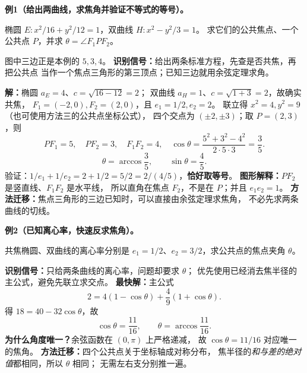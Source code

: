 \clearpage
\begin{examplebox}
\textbf{例1（给出两曲线，求焦角并验证不等式的等号）。}

椭圆 $E:x^2/16+y^2/12=1$，双曲线 $H:x^2-y^2/3=1$。
求它们的公共焦点、一个公共点 $P$，并求 $\theta=\angle F_1PF_2$。


\begin{center}

\end{center}
图中三边正是本例的 $5,3,4$。
\textbf{识别信号：}给出两条标准方程，先查是否共焦，再把公共点
当作一个焦点三角形的第三顶点；已知三边就用余弦定理求角。

\textbf{解：}椭圆 $a_E=4$、$c=\sqrt{16-12}=2$；
双曲线 $a_H=1$、$c=\sqrt{1+3}=2$，故确实共焦，
$F_1=(-2,0),F_2=(2,0)$，且 $e_1=1/2,e_2=2$。
联立得 $x^2=4,y^2=9$（也可使用方法三的公共点坐标公式），
四个交点为 $(\pm2,\pm3)$；取 $P=(2,3)$，则
\[
 PF_1=5,\quad PF_2=3,\quad F_1F_2=4,
\quad\cos\theta=\frac{5^2+3^2-4^2}{2\cdot5\cdot3}=\frac35.
\]
\[
 \boxed{\theta=\arccos\frac35},\qquad\sin\theta=\frac45.
\]
验证：$1/e_1+1/e_2=2+1/2=5/2=2/(4/5)$，\textbf{恰好取等号}。
\textbf{图形解释：}$PF_2$ 是竖直线、$F_1F_2$ 是水平线，
所以直角在焦点 $F_2$，不是在 $P$；并且 $e_1e_2=1$。
\textbf{方法迁移：}焦点三角形的三边已知时，可以直接由余弦定理求焦角，
不必先求两条曲线的切线。
\end{examplebox}

\clearpage
\begin{examplebox}
\textbf{例2（已知离心率，快速反求焦角）。}

共焦椭圆、双曲线的离心率分别是
$e_1=1/2$、$e_2=3/2$，求公共点的焦点夹角 $\theta$。

\textbf{识别信号：}只给两条曲线的离心率，问题却要求 $\theta$；
优先使用已经消去焦半径的主公式，避免先联立求交点。
\textbf{最快解：}主公式
\[
 2=4(1-\cos\theta)+\frac49(1+\cos\theta).
\]
得 $18=40-32\cos\theta$，故
\[
 \boxed{\cos\theta=\frac{11}{16}},\qquad
 \boxed{\theta=\arccos\frac{11}{16}}.
\]
\textbf{为什么角度唯一？}余弦函数在 $(0,\pi)$ 上严格递减，
故 $\cos\theta=11/16$ 对应唯一的焦角。
\textbf{方法迁移：}四个公共点关于坐标轴成对称分布，
焦半径的\emph{和与差的绝对值}都相同，所以 $\theta$ 相同；
无需左右支分别推一遍。
\end{examplebox}

